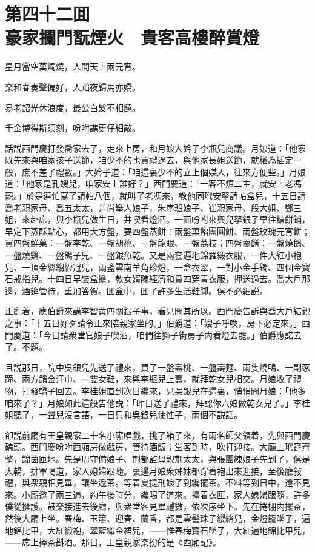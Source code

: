 
\chapter*{第四十二囬　\\豪家攔門翫煙火　貴客高樓醉賞燈}


\begin{myquote}
星月當空萬燭燒，人間天上兩元宵。

楽和春奏聲偏好，人蹈夜歸馬亦嬌。

易老韶光休浪度，最公白髮不相饒。

千金博得斯須刻，吩咐譙更仔細敲。
\end{myquote}

話説西門慶打發喬家去了，走來上房，和月娘大妗子李瓶兒商議。月娘道：「他家既先來與咱家孩子送節，咱少不的也買禮過去，與他家長姐送節，就權為插定一般，庶不差了禮數。」大妗子道：「咱這裏少不的立上個媒人，往來方便些。」月娘道：「他家是孔嫂兒，咱家安上誰好？」西門慶道：「一客不煩二主，就安上老馮罷。」於是連忙冩了請帖八個，就叫了老馮來，教他同玳安拏請帖盒兒，十五日請喬老親家母、喬五太太，并尚舉人娘子，朱序班娘子、崔親家母、段大姐、鄭三姐，來赴席，與李瓶兒做生日，并喫看燈酒。一面吩咐來興兒拏銀子早往糖餅鋪，早定下蒸酥點心，都用大方盤，要四盤蒸餅：兩盤菓餡團圓餅、兩盤玫瑰元宵餅；買四盤鮮菓：一盤李乾、一盤胡桃、一盤龍眼、一盤荔枝；四盤羹餚：一盤燒鵝、一盤燒鷄、一盤鴿子兒、一盤銀魚乾。又是兩套遍地錦羅緞衣服，一件大紅小袍兒、一頂金絲縐紗冠兒，兩盞雲南羊角珍燈，一盒衣翠，一對小金手鐲、四個金寳石戒指兒。十四日早裝盒擔，教女婿陳經濟和賁四穿青衣服，押送過去。喬大戶那邊，酒筵管待，重加答賀。囬盒中，囬了許多生活鞋脚。俱不必細説。

正亂着，應伯爵來講李智黄四關銀子事，看見問其所以。西門慶告訴與喬大戶結親之事：「十五日好歹請令正來陪親家坐的。」伯爵道：「嫂子呼喚，房下必定來。」西門慶道：「今日請衆堂官娘子喫酒，咱們往獅子街房子内看燈去罷。」伯爵應諾去了。不題。

且説那日，院中吳銀兒先送了禮來，買了一盤壽桃、一盤壽麵、兩隻燒鴨、一副豕蹄、兩方銷金汗巾、一雙女鞋，來與李瓶兒上壽，就拜乾女兒相交。月娘收了禮物，打發轎子回去。李桂姐直到次日纔來，見吳銀兒在這裏，悄悄問月娘：「他多咱來了？」月娘如此這般告他説：「昨日送了禮來，拜認你六娘做乾女兒了。」李桂姐聽了，一聲兒沒言語，一日只和吳銀兒使性子，兩個不説話。

卻説前廳有王皇親家二十名小廝唱戲，挑了箱子來，有兩名師父領着，先與西門慶磕頭。西門慶吩咐西廂房做戲房，管待酒飯；堂客到時，吹打迎接。大廳上玳筵齊整，錦茵匝地。先是周守備娘子、荆都監母親荆太太，與張團練娘子先到了，俱是大轎，排軍喝道，家人媳婦跟隨。裏邊月娘衆姊妹都穿着袍出來迎接，至後廳敍禮，與衆親相見畢，讓坐遞茶。等着夏提刑娘子到纔擺茶。不料等到日中，還不見來。小廝邀了兩三遍，約午後時分，纔喝了道來。擡着衣匣，家人媳婦跟隨，許多僕從擁護。鼓楽接進去後廳，與衆堂客見畢禮數，依次序坐下。先在捲棚内擺茶，然後大廳上坐。春梅、玉簫、迎春、蘭香，都是雲髻珠子纓絡兒，金燈籠墜子，遍地錦比甲，大紅緞袍，翠藍織金裙兒，——惟春梅寳石墜子，大紅遍地錦比甲兒，——席上捧茶斟酒。那日，王皇親家楽扮的是《西廂記》。

